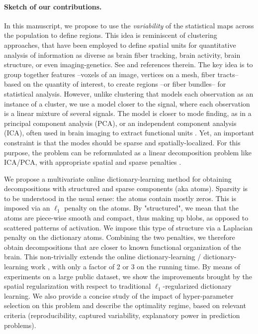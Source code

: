 \paragraph*{Sketch of our contributions.}
In this manuscript, we propose to use the \textit{variability} of the statistical
maps across the population to define regions.
%
This idea is reminiscent of
clustering approaches, that have been employed to define spatial units
for quantitative analysis of information as diverse as brain fiber
tracking, brain activity, brain structure, or even imaging-genetics. See   \citep{Varol2014,hibar2013genetic} and references therein.
%
The key idea is to group together features --voxels of an image,
vertices on a mesh, fiber tracts-- based on the quantity of interest, to
create regions --or fiber bundles-- for statistical analysis. However,
unlike clustering that models each observation as an instance of a
cluster, we use a model closer to the signal, where each observation is a
linear mixture of several signals. The model is closer to mode finding,
as in a principal component analysis (PCA), or an independent component
analysis (ICA), often used in brain imaging to extract functional units
  \citep{beckmann2004}. Yet, an important constraint is that the modes
 should be sparse and spatially-localized. For this purpose, the problem can be reformulated as a linear decomposition problem like ICA/PCA, with
 appropriate spatial and sparse penalties   \citep{varoquaux2011,abraham2013}. 

We propose a multivariate online dictionary-learning method for obtaining
decompositions with structured and sparse components (aka atoms).
Sparsity is to be understood in the usual sense: the atoms contain mostly
zeros. This is imposed via an $\ell_1$ penalty on the atoms. 
%
By "structured", we mean that the atoms are piece-wise smooth and
compact, thus making up blobs, as opposed to scattered patterns of
activation. We impose this type of structure via a Laplacian penalty on the
dictionary atoms. Combining the two penalties, we therefore
obtain decompositions that are closer to known functional organization of the brain. This non-trivially extends the online dictionary-learning /
dictionary-learning work   \citep{mairal2010}, with only a factor of 2
or 3 on the running time.
%
By means of experiments on a large public dataset, we show the
improvements brought by the spatial regularization with respect to
traditional $\ell_1$-regularized dictionary learning.
%
We also provide a concise study of the impact of
hyper-parameter selection on this problem and describe the optimality
regime, based on relevant criteria (reproducibility, captured
variability, explanatory power in prediction problems).

